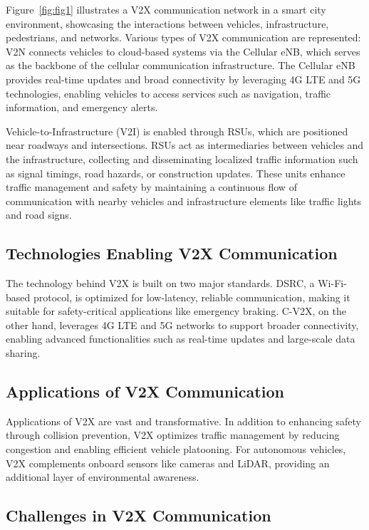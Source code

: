 Figure~\ref{fig:fig1} illustrates a V2X communication network in a smart city environment, showcasing the interactions between
 vehicles, infrastructure, pedestrians, and networks. Various types of V2X communication are represented:
  \ac{V2N} connects vehicles to cloud-based systems via the Cellular \ac{eNB},
   which serves as the backbone of the cellular communication infrastructure. The Cellular eNB provides real-time updates
    and broad connectivity by leveraging 4G LTE and 5G technologies, enabling vehicles to access services such as navigation, 
    traffic information, and emergency alerts. \cite{cite-key}

Vehicle-to-Infrastructure (V2I) is enabled through \ac{RSUs}, which are positioned near roadways 
and intersections. RSUs act as intermediaries between vehicles and the infrastructure, collecting and disseminating
 localized traffic information such as signal timings, road hazards, or construction updates. These units enhance 
 traffic management and safety by maintaining a continuous flow of communication with nearby vehicles and infrastructure 
 elements like traffic lights and road signs. \cite{10806826}
    

 \subsection{Technologies Enabling V2X Communication}

 The technology behind V2X is built on two major standards. \ac{DSRC},
 a Wi-Fi-based protocol, is optimized for low-latency, reliable communication, making it suitable for 
 safety-critical applications like emergency braking. \ac{C-V2X}, on the other hand, leverages 
 4G LTE and 5G networks to support broader connectivity, enabling advanced functionalities such as real-time updates and 
 large-scale data sharing.

 \subsection{Applications of V2X Communication}

Applications of V2X are vast and transformative. In addition to enhancing safety through 
collision prevention, V2X optimizes traffic management by reducing congestion and enabling 
efficient vehicle platooning. For autonomous vehicles, V2X complements onboard sensors like 
cameras and LiDAR, providing an additional layer of environmental awareness.

\subsection{Challenges in V2X Communication}

